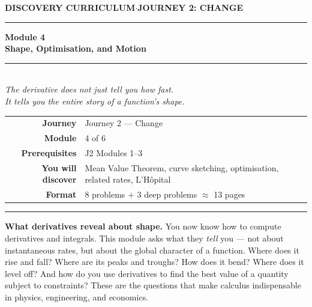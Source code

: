 \documentclass[12pt, a4paper]{article}
\newcounter{problem}
\begin{document}

\thispagestyle{empty}
\begin{center}
{\small\color{MidBlue}\textbf{DISCOVERY CURRICULUM}\quad$\cdot$\quad\textbf{JOURNEY 2: CHANGE}}

\vspace{0.6cm}
{\color{NavyBlue}\rule{\linewidth}{2pt}}
\vspace{0.5cm}

{\Huge\bfseries\color{NavyBlue}Module 4}\\[0.3cm]
{\LARGE\bfseries\color{MidBlue}Shape, Optimisation, and Motion}\\[0.4cm]
{\color{Gold}\rule{0.4\linewidth}{1.2pt}}\\[0.4cm]
{\large\itshape\color{DarkGrey}
The derivative does not just tell you how fast.\\[0.15cm]
It tells you the entire story of a function's shape.}

\vspace{1cm}
\begin{tabular}{rl}
\color{DarkGrey}\textbf{Journey}           & Journey 2 --- Change \\[4pt]
\color{DarkGrey}\textbf{Module}            & 4 of 6 \\[4pt]
\color{DarkGrey}\textbf{Prerequisites}     & J2 Modules 1--3 \\[4pt]
\color{DarkGrey}\textbf{You will discover} & Mean Value Theorem, curve sketching, optimisation, related rates, L'H\^{o}pital \\[4pt]
\color{DarkGrey}\textbf{Format}            & 8 problems $+$ 3 deep problems $\approx$ 13 pages \\
\end{tabular}

\vspace{1cm}
{\color{NavyBlue}\rule{\linewidth}{2pt}}
\end{center}

\vspace{0.5cm}

\noindent\textbf{What derivatives reveal about shape.}
You now know how to compute derivatives and integrals. This module asks what they \emph{tell} you --- not about instantaneous rates, but about the global character of a function. Where does it rise and fall? Where are its peaks and troughs? How does it bend? Where does it level off? And how do you use derivatives to find the best value of a quantity subject to constraints? These are the questions that make calculus indispensable in physics, engineering, and economics.
\end{document}
